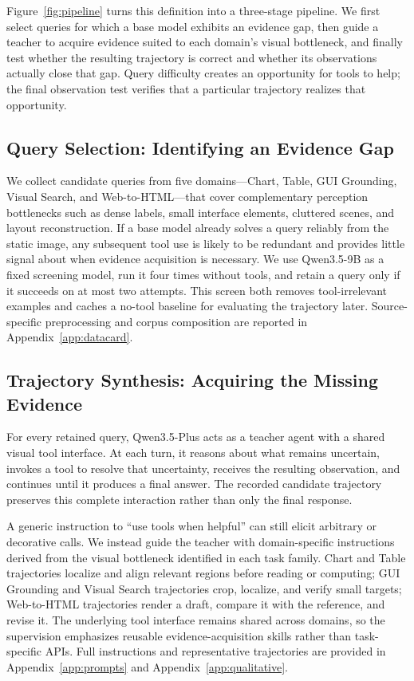 Figure~\ref{fig:pipeline} turns this definition into a three-stage pipeline. We first select queries for which a base model exhibits an evidence gap, then guide a teacher to acquire evidence suited to each domain's visual bottleneck, and finally test whether the resulting trajectory is correct and whether its observations actually close that gap. Query difficulty creates an opportunity for tools to help; the final observation test verifies that a particular trajectory realizes that opportunity.

\subsection{Query Selection: Identifying an Evidence Gap}
\label{sec:data}

We collect candidate queries from five domains---Chart, Table, GUI Grounding, Visual Search, and Web-to-HTML---that cover complementary perception bottlenecks such as dense labels, small interface elements, cluttered scenes, and layout reconstruction. If a base model already solves a query reliably from the static image, any subsequent tool use is likely to be redundant and provides little signal about when evidence acquisition is necessary. We use Qwen3.5-9B \citep{qwen35blog} as a fixed screening model, run it four times without tools, and retain a query only if it succeeds on at most two attempts. This screen both removes tool-irrelevant examples and caches a no-tool baseline for evaluating the trajectory later. Source-specific preprocessing and corpus composition are reported in Appendix~\ref{app:datacard}.

\subsection{Trajectory Synthesis: Acquiring the Missing Evidence}
\label{sec:synthesis}

For every retained query, Qwen3.5-Plus acts as a teacher agent with a shared visual tool interface. At each turn, it reasons about what remains uncertain, invokes a tool to resolve that uncertainty, receives the resulting observation, and continues until it produces a final answer. The recorded candidate trajectory preserves this complete interaction rather than only the final response.

A generic instruction to ``use tools when helpful'' can still elicit arbitrary or decorative calls. We instead guide the teacher with domain-specific instructions derived from the visual bottleneck identified in each task family. Chart and Table trajectories localize and align relevant regions before reading or computing; GUI Grounding and Visual Search trajectories crop, localize, and verify small targets; Web-to-HTML trajectories render a draft, compare it with the reference, and revise it. The underlying tool interface remains shared across domains, so the supervision emphasizes reusable evidence-acquisition skills rather than task-specific APIs. Full instructions and representative trajectories are provided in Appendix~\ref{app:prompts} and Appendix~\ref{app:qualitative}.

